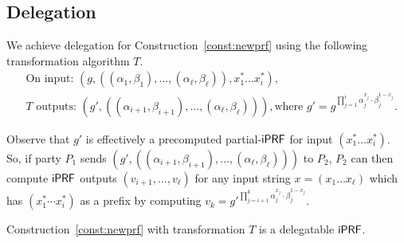 \subsection{Delegation}
We achieve delegation for Construction~\ref{const:newprf} using the
following transformation algorithm $T$.
\begin{align*}
&\text{On input: }
(g,((\alpha_1,\beta_1),\ldots,(\alpha_\ell,\beta_\ell)),x^*_1\ldots{}x^*_i),
\\&T\text{ outputs: }
(g',((\alpha_{i+1},\beta_{i+1}),\ldots{},(\alpha_\ell,\beta_\ell))),
\text{where }{g'}=g^{\prod_{j=1}^{i}{\alpha_j^{x_j}\cdot\beta_j^{1-x_j}}}.
\end{align*}

Observe that $g'$ is effectively a precomputed partial-$\mathsf{i}\mathsf{PRF}$ for input
$(x^*_1\ldots{}x^*_i)$.  So, if party $P_1$ sends
$({g'},((\alpha_{i+1},\beta_{i+1}),\ldots{},(\alpha_\ell,\beta_\ell)))$
to $P_2$, $P_2$ can then compute $\mathsf{i}\mathsf{PRF}$ outputs
$(v_{i+1},\ldots,v_\ell)$ for any input string $x=(x_1\ldots{}x_\ell)$
which has $(x^*_1\cdots{}x^*_i)$ as a prefix by computing
$v_{k}={g'}^{{\prod_{j={i+1}}^k{\alpha_j^{x_j}\cdot\beta_j^{1-x_j}}}}$.

\begin{lemma}
Construction~\ref{const:newprf} with transformation $T$ is a
delegatable $\mathsf{i}\mathsf{PRF}$.
\end{lemma}


